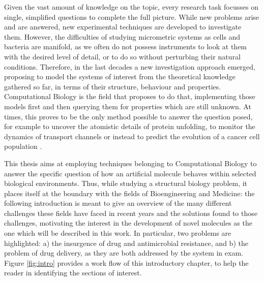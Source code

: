 Given the vast amount of knowledge on the topic, every research task focusses on single, simplified questions to complete the full picture. While new problems arise and are answered, new experimental techniques are developed to investigate them. However, the difficulties of studying micrometric systems as cells and bacteria are manifold, as we often do not possess instruments to look at them with the desired level of detail, or to do so without perturbing their natural conditions. Therefore, in the last decades a new investigation approach emerged, proposing to model the systems of interest from the theoretical knowledge gathered so far, in terms of their structure, behaviour and properties.
%
Computational Biology is the field that proposes to do that, implementing those models first and then querying them for properties which are still unknown. At times, this proves to be the only method possible to answer the question posed, for example to uncover the atomistic details of protein unfolding, to monitor the dynamics of transport channels or instead to predict the evolution of a cancer cell population \citep{Lee2009,Dror2012,Wang2015systbio}.

This thesis aims at employing techniques belonging to Computational Biology to answer the specific question of how an artificial molecule behaves within selected biological environments.
%
Thus, while studying a structural biology problem, it places itself at the boundary with the fields of Bioengineering and Medicine: the following introduction is meant to give an overview of the many different challenges these fields have faced in recent years and the solutions found to those challenges, motivating the interest in the development of novel molecules as the one which will be described in this work. In particular, two problems are highlighted: a) the insurgence of drug and antimicrobial resistance, and b) the problem of drug delivery, as they are both addressed by the system in exam. Figure \ref{fig:intro} provides a work flow of this introductory chapter, to help the reader in identifying the sections of interest.

